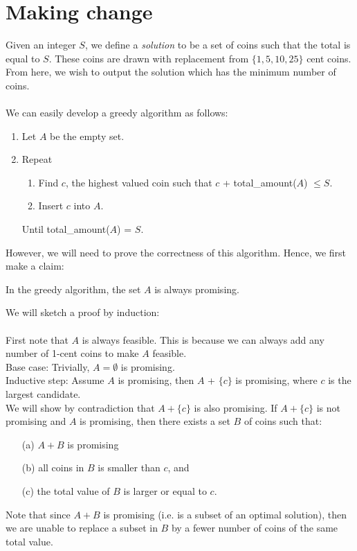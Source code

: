 \documentclass[a4paper]{article}
\begin{document}
\section{Making change}
Given an integer $S$, we define a \textit{solution} to be a set of coins such that the total is equal to $S$. These coins are drawn with replacement from $\{1, 5, 10, 25\}$ cent coins. From here, we wish to output the solution which has the minimum number of coins.\\ \\
We can easily develop a greedy algorithm as follows:
\begin{enumerate}
	\item Let $A$ be the empty set.
	\item Repeat
	\begin{enumerate}
		\item Find $c$, the highest valued coin such that $c$ + total\_amount($A$) $\le S$.
		\item Insert $c$ into $A$.
	\end{enumerate}
		Until total\_amount($A$) = $S$.
\end{enumerate}
However, we will need to prove the correctness of this algorithm. Hence, we first make a claim:
\begin{center}
	In the greedy algorithm, the set $A$ is always promising.
\end{center}
We will sketch a proof by induction:\\ \\
First note that $A$ is always feasible. This is because we can always add any number of 1-cent coins to make $A$ feasible.\\
Base case: Trivially, $A = \emptyset$ is promising.\\
Inductive step: Assume $A$ is promising, then $A$ + $\{c\}$ is promising, where $c$ is the largest candidate.\\
We will show by contradiction that $A + \{c\}$ is also promising. If $A + \{c\}$ is not promising and $A$ is promising, then there exists a set $B$ of coins such that:
\begin{enumerate}
	\item[(a)] $A+B$ is promising
	\item[(b)] all coins in $B$ is smaller than $c$, and
	\item[(c)] the total value of $B$ is larger or equal to $c$.
\end{enumerate}
Note that since $A+B$ is promising (i.e. is a subset of an optimal solution), then we are unable to replace a subset in $B$ by a fewer number of coins of the same total value.\\ \\
\end{document}
